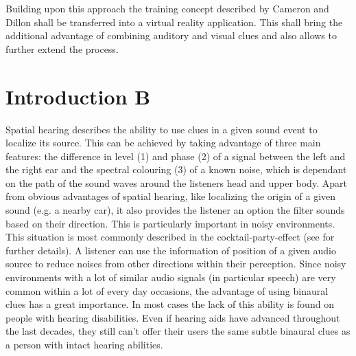 \documentclass[a4paper,11pt]{article}%
\renewcommand{\\}{\vspace*{0.5\baselineskip} \newline}
\begin{document}
\newline
\newline
Building upon this approach the training concept described by Cameron and Dillon shall be transferred into a virtual reality application. This shall bring the additional advantage of combining auditory and visual clues and also allows to further extend the process. 








\newpage
\section{Introduction B}
\label{sec:introduction_b}
Spatial hearing describes the ability to use clues in a given sound event to localize its source. This can be achieved by taking advantage of three main features: the difference in level (1) and phase (2) of a signal between the left and the right ear and the spectral colouring (3) of a known noise, which is dependant on the path of the sound waves around the listeners head and upper body.
\newline
\newline
Apart from obvious advantages of spatial hearing, like localizing the origin of a given sound (e.g. a nearby car), it also provides the listener an option the filter sounds based on their direction. This is particularly important in noisy environments. This situation is most commonly described in the \dq cocktail-party-effect\dq{} (see \cite{CP} for further details). A listener can use the information of position of a given audio source to reduce noises from other directions within their perception.
\newline
\newline
Since noisy environments with a lot of similar audio signals (in particular speech) are very common within a lot of every day occasions, the advantage of using binaural clues has a great importance. In most cases the lack of this ability is found on people with hearing disabilities. Even if hearing aids have advanced throughout the last decades, they still can't offer their users the same subtle binaural clues as a person with intact hearing abilities.
\end{document}
